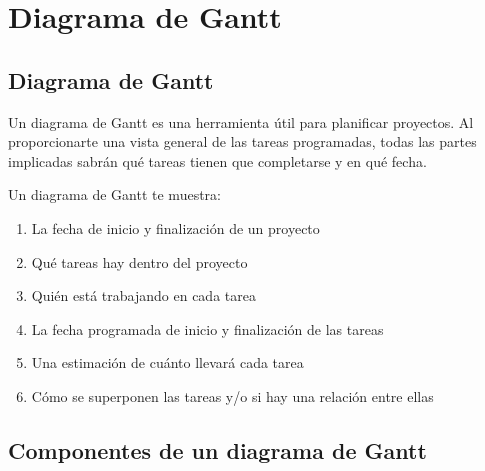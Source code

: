 \documentclass[../main]{subfiles}
\begin{document}
\chapter{Diagrama de Gantt}



\section{Diagrama de Gantt}
Un diagrama de Gantt es una herramienta útil para planificar proyectos. Al proporcionarte una vista general de las tareas programadas, todas las partes implicadas sabrán qué tareas tienen que completarse y en qué fecha.

Un diagrama de Gantt te muestra:
\begin{enumerate}
    \item La fecha de inicio y finalización de un proyecto
\item Qué tareas hay dentro del proyecto
\item Quién está trabajando en cada tarea
\item La fecha programada de inicio y finalización de las tareas
\item Una estimación de cuánto llevará cada tarea
\item Cómo se superponen las tareas y/o si hay una relación entre ellas
\end{enumerate}
\section{Componentes de un diagrama de Gantt}
\end{document}
